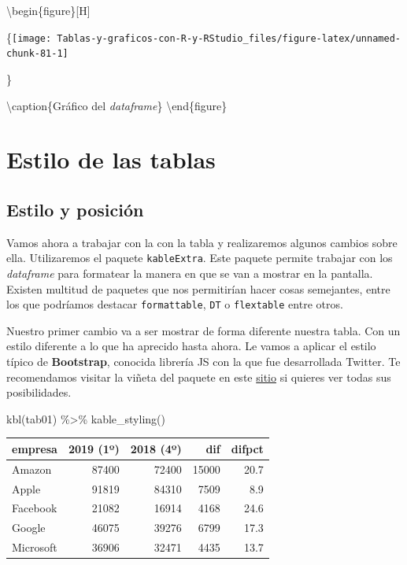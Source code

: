\documentclass[
]{book}
\newenvironment{Shaded}{\begin{snugshade}}{\end{snugshade}}
\newcommand{\FunctionTok}[1]{\textcolor[rgb]{0.00,0.00,0.00}{#1}}
\newcommand{\NormalTok}[1]{#1}
\newcommand{\SpecialCharTok}[1]{\textcolor[rgb]{0.00,0.00,0.00}{#1}}
\begin{document}
\textbackslash begin\{figure\}{[}H{]}

\{\centering \texttt{[image: Tablas-y-graficos-con-R-y-RStudio\_files/figure-latex/unnamed-chunk-81-1]}

\}

\textbackslash caption\{Gráfico del \emph{dataframe}\}\label{fig:unnamed-chunk-81}
\textbackslash end\{figure\}

\hypertarget{estilo-de-las-tablas}{%
\section{Estilo de las tablas}\label{estilo-de-las-tablas}}

\hypertarget{estilo-y-posiciuxf3n}{%
\subsection{Estilo y posición}\label{estilo-y-posiciuxf3n}}

Vamos ahora a trabajar con la con la tabla y realizaremos algunos cambios sobre ella. Utilizaremos el paquete \texttt{kableExtra}. Este paquete permite trabajar con los \emph{dataframe} para formatear la manera en que se van a mostrar en la pantalla. Existen multitud de paquetes que nos permitirían hacer cosas semejantes, entre los que podríamos destacar \texttt{formattable}, \texttt{DT} o \texttt{flextable} entre otros.

Nuestro primer cambio va a ser mostrar de forma diferente nuestra tabla. Con un estilo diferente a lo que ha aprecido hasta ahora. Le vamos a aplicar el estilo típico de \textbf{Bootstrap}, conocida librería JS con la que fue desarrollada Twitter. Te recomendamos visitar la viñeta del paquete en este \href{https://cran.r-project.org/web/packages/kableExtra/vignettes/awesome_table_in_html.html}{sitio} si quieres ver todas sus posibilidades.

\begin{Shaded}
\begin{Highlighting}[]
\FunctionTok{kbl}\NormalTok{(tab01) }\SpecialCharTok{\%\textgreater{}\%}
  \FunctionTok{kable\_styling}\NormalTok{()}
\end{Highlighting}
\end{Shaded}

\begin{table}
\centering
\begin{tabular}[t]{l|r|r|r|r}
\hline
empresa & 2019 (1º) & 2018 (4º) & dif & difpct\\
\hline
Amazon & 87400 & 72400 & 15000 & 20.7\\
\hline
Apple & 91819 & 84310 & 7509 & 8.9\\
\hline
Facebook & 21082 & 16914 & 4168 & 24.6\\
\hline
Google & 46075 & 39276 & 6799 & 17.3\\
\hline
Microsoft & 36906 & 32471 & 4435 & 13.7\\
\hline
\end{tabular}
\end{table}
\end{document}
